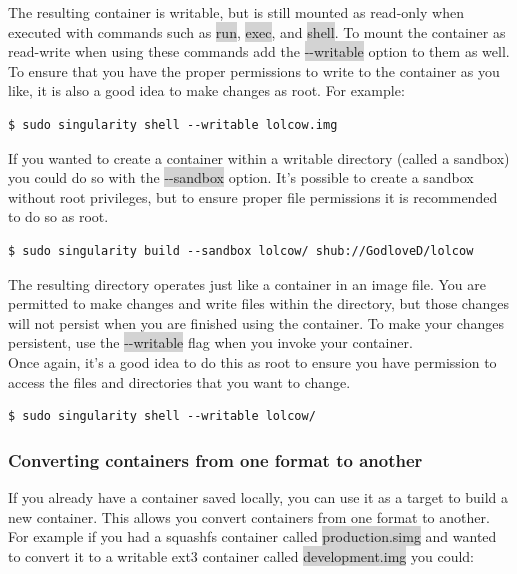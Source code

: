 \documentclass[a4paper]{article}
\newcounter{subsubsubsection}[subsubsection]
\begin{document}
	
	The resulting container is writable, but is still mounted as read-only when executed with commands such as \colorbox{lightgray}{run}, \colorbox{lightgray}{exec}, and \colorbox{lightgray}{shell}. To mount the container as read-write when using these commands add the \colorbox{lightgray}{-{}-writable} option to them as well.\\[0.1in]
	To ensure that you have the proper permissions to write to the container as you like, it is also a good idea to make changes as root. For example:
\begin{lstlisting}[frame=single]  
$ sudo singularity shell --writable lolcow.img
\end{lstlisting}	 
	
	If you wanted to create a container within a writable directory (called a sandbox) you could do so with the \colorbox{lightgray}{-{}-sandbox} option. It’s possible to create a sandbox without root privileges, but to ensure proper file permissions it is recommended to do so as root.
	
\begin{lstlisting}[frame=single]  
$ sudo singularity build --sandbox lolcow/ shub://GodloveD/lolcow
\end{lstlisting}	
	
The resulting directory operates just like a container in an image file. You are permitted to make changes and write files within the directory, but those changes will not persist when you are finished using the container. To make your changes persistent, use the \colorbox{lightgray}{-{}-writable} flag when you invoke your container.
\\[0.1in]
Once again, it’s a good idea to do this as root to ensure you have permission to access the files and directories that you want to change.

\begin{lstlisting}[frame=single] 
$ sudo singularity shell --writable lolcow/
\end{lstlisting}
	
\subsubsection{Converting containers from one format to another}

If you already have a container saved locally, you can use it as a target to build a new container. This allows you convert containers from one format to another. For example if you had a squashfs container called \colorbox{lightgray}{production.simg} and wanted to convert it to a writable ext3 container called \colorbox{lightgray}{development.img} you could:
\end{document}
